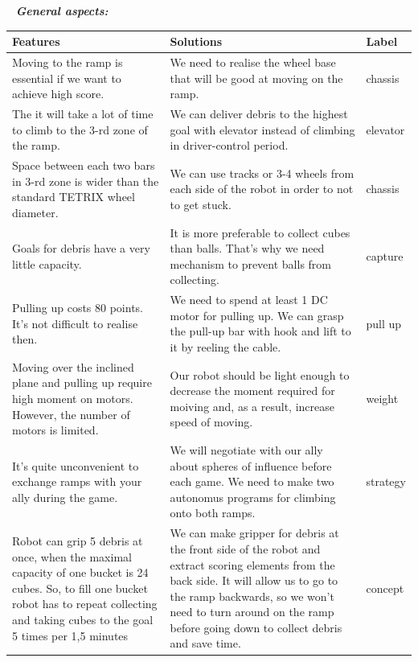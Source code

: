 	 \newline
	\textit{\textbf{General aspects:}}
	\begin{table}[H]
		\vspace{-2mm}
		\begin{center}
			\begin{tabular}{|p{0.4\linewidth}|p{0.5\linewidth}|p{0.1\linewidth}|}
				\hline
				Features & Solutions & Label \\
				\hline
				Moving to the ramp is essential if we want to achieve high score. & We need to realise the wheel base that will be good at moving on the ramp. & chassis \\
				\hline
				The it will take a lot of time to climb to the 3-rd zone of the ramp. & We can deliver debris to the highest goal with elevator instead of climbing in driver-control period. & elevator \\
				\hline
				Space between each two bars in 3-rd zone is wider than the standard TETRIX wheel diameter. & We can use tracks or 3-4 wheels from each side of the robot in order to not to get stuck. & chassis \\
				\hline
				Goals for debris have a very little capacity. & It is more preferable to collect cubes than balls. That's why we need mechanism to prevent balls from collecting. & capture \\
				\hline
				Pulling up costs 80 points. It's not difficult to realise then. & We need to spend at least 1 DC motor for pulling up. We can grasp the pull-up bar with hook and lift to it by reeling the cable. & pull up \\
				\hline
				Moving over the inclined plane and pulling up require high moment on motors. However, the number of motors is limited. & Our robot should be light enough to decrease the moment required for moiving and, as a result, increase speed of moving. & weight \\
				\hline
				It's quite unconvenient to exchange ramps with your ally during the game. & We will negotiate with our ally about spheres of influence before each game. We need to make two autonomus programs for climbing onto both ramps. & strategy \\
				\hline
				Robot can grip 5 debris at once, when the maximal capacity of one bucket is 24 cubes. So, to fill one bucket robot has to repeat collecting and taking cubes to the goal 5 times per 1,5 minutes & We can make gripper for debris at the front side of the robot and extract scoring elements from the back side. It will allow us to go to the ramp backwards, so we won't need to turn around on the ramp before going down to collect debris and save time. & concept \\

\end{tabular}
\end{center}
\end{table}
